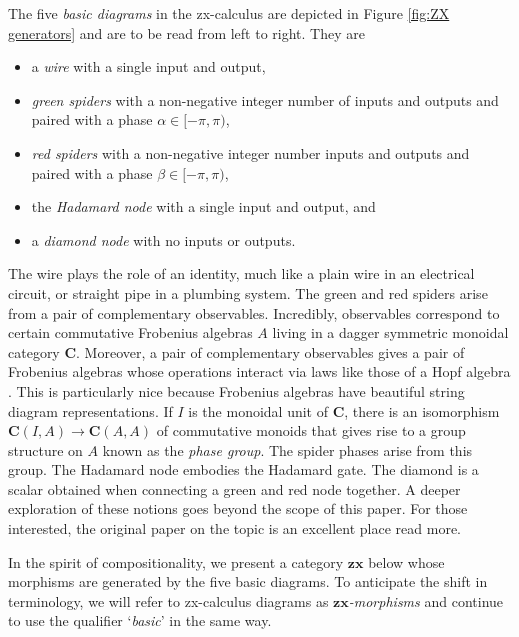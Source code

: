 \documentclass[./1--Catfying_zxCalc--Master.tex]{subfiles} %
\begin{document}
The five \emph{basic diagrams} 
in the zx-calculus are depicted 
in Figure \ref{fig:ZX generators}
and are to be read from left to right. 
They are
\begin{itemize}
	\item a \emph{wire} with 
		a single input and output,
	\item \emph{green spiders} with 
		a non-negative integer number of 
		inputs and outputs and 
		paired with a phase $\alpha \in [-\pi,\pi)$,
	\item \emph{red spiders} with 
		a non-negative integer number 
		inputs and outputs and 
		paired with a phase $\beta \in [-\pi,\pi)$,
	\item the \emph{Hadamard node} with
		 a single input and output, and
	\item a \emph{diamond node} with 
		no inputs or outputs.
\end{itemize}
The wire plays the role 
of an identity, much like a 
plain wire in an electrical circuit, 
or straight pipe in a plumbing system. 
The green and red spiders 
arise from a pair of 
complementary observables.  
Incredibly, observables 
correspond to certain 
commutative Frobenius algebras $A$ 
living in a 
dagger symmetric monoidal category 
	$\mathbf{C}$. 
Moreover, a pair of 
complementary observables gives a 
pair of Frobenius algebras whose 
operations interact via laws like 
those of a Hopf algebra 
	\cite{CoeckePavlovic_QuanMeasSums, 
		CoeckePavVicary_OrthogBases}.  
This is particularly nice because 
Frobenius algebras have 
beautiful string diagram representations. 
If $I$ is the monoidal unit of $\mathbf{C}$, 
there is an isomorphism 
	$\mathbf{C}(I,A) \to \mathbf{C}(A,A)$ 
of commutative monoids 
that gives rise to a 
group structure on $A$ 
known as the \emph{phase group}.  
The spider phases arise from this group.
The Hadamard node embodies 
the Hadamard gate. 
The diamond is a scalar obtained when
connecting a green and red node together.  
A deeper exploration of these notions 
goes beyond the scope of this paper.  
For those interested, 
the original paper on the topic
	\cite{CoeckeDuncan_QuantumObsFullPaper}
is an excellent place read more.

In the spirit of compositionality, 
we present a category 
$\mathbf{zx}$ below 
whose morphisms are 
generated by the 
five basic diagrams. 
To anticipate the shift
in terminology, we will
refer to zx-calculus diagrams
as \emph{$\mathbf{zx}$-morphisms} 
and continue to use the
qualifier `\emph{basic}' in the 
same way.
\end{document}
